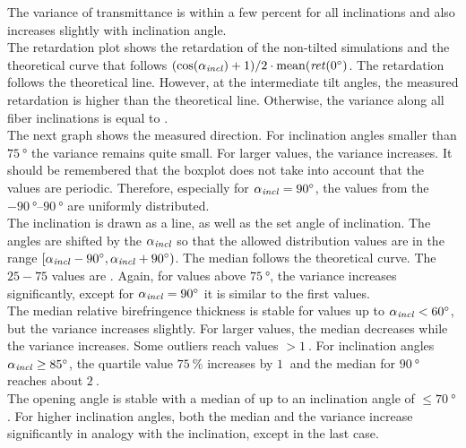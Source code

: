 The variance of transmittance is within a few percent for all inclinations and also increases slightly with inclination angle.
\\
%
The retardation plot shows the retardation of the non-tilted simulations and the theoretical curve that follows $(\cos(\textnormal{$\alpha_{\mathit{incl}}$}) + 1) / 2 \cdot \mathrm{mean}(\mathit{ret}(\SI{0}{\degree})$.
The retardation follows the theoretical line.
However, at the intermediate tilt angles, the measured retardation is higher than the theoretical line.
Otherwise, the variance along all fiber inclinations is equal to \modelInc{}.
\\
%
The next graph shows the measured direction.
For inclination angles smaller than $\SI{75}{\degree}$ the variance remains quite small.
For larger values, the variance increases.
It should be remembered that the boxplot does not take into account that the values are periodic.
Therefore, especially for $\textnormal{$\alpha_{\mathit{incl}}$}=\SI{90}{\degree}$, the values from the $\SIrange{-90}{90}{\degree}$ are uniformly distributed.
\\
%
The inclination is drawn as a line, as well as the set angle of inclination.
The angles are shifted by the $\textnormal{$\alpha_{\mathit{incl}}$}$ so that the allowed distribution values are in the range $[\textnormal{$\alpha_{\mathit{incl}}$}-\SI{90}{\degree}, \textnormal{$\alpha_{\mathit{incl}}$}+\SI{90}{\degree})$.
The median follows the theoretical curve.
The $25-75$ values are \dummy{} .
Again, for values above $\SI{75}{\degree}$, the variance increases significantly, except for $\textnormal{$\alpha_{\mathit{incl}}$} = \SI{90}{\degree}$ it is similar to the first values.
\\
%
The median relative birefringence thickness \trel{} is stable for values up to $\textnormal{$\alpha_{\mathit{incl}}$} < \SI{60}{\degree}$, but the variance increases slightly.
For larger values, the median decreases while the variance increases.
Some outliers reach values $>\SI{1}{}$.
For inclination angles $\textnormal{$\alpha_{\mathit{incl}}$} \ge \SI{85}{\degree}$, the quartile value $\SI{75}{\percent}$ increases by $\SI{1}{}$ and the median for $\SI{90}{\degree}$ reaches about $\SI{2}{}$.
\\
%
The opening angle \modelDOmega{} is stable with a median of \dummy{} up to an inclination angle of $\le \SI{70}{\degree}$.
For higher inclination angles, both the median and the variance increase significantly in analogy with the inclination, except in the last case.
%
%
%
